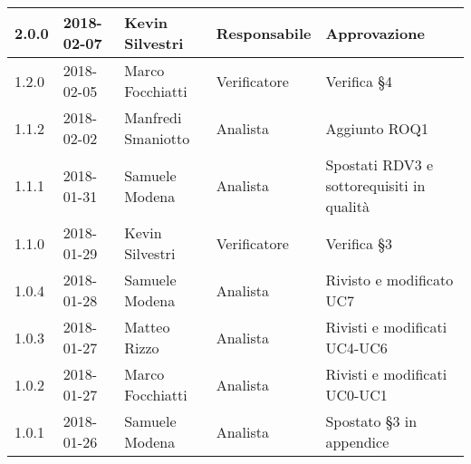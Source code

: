 \documentclass[./AnalisideiRequisiti.tex]{subfiles}
\begin{document}
{\begin{longtable}{|p{20mm}|p{20mm}|p{40mm}|p{30mm}|p{50mm}|}
		2.0.0 & 2018-02-07 & Kevin Silvestri & Responsabile & Approvazione\\ \hline 
		1.2.0 & 2018-02-05 & Marco Focchiatti & Verificatore & Verifica §4\\ \hline    
		1.1.2 & 2018-02-02 & Manfredi Smaniotto & Analista & Aggiunto ROQ1\\ \hline 
		1.1.1 & 2018-01-31 & Samuele Modena & Analista & Spostati RDV3 e sottorequisiti in qualità\\ \hline  
		1.1.0 & 2018-01-29 & Kevin Silvestri & Verificatore & Verifica §3\\ \hline  
		1.0.4 & 2018-01-28 & Samuele Modena & Analista & Rivisto e modificato UC7\\ \hline  
		1.0.3 & 2018-01-27 & Matteo Rizzo & Analista & Rivisti e modificati UC4-UC6\\ \hline    
		1.0.2 & 2018-01-27 & Marco Focchiatti & Analista & Rivisti e modificati UC0-UC1\\ \hline  
		1.0.1 & 2018-01-26 & Samuele Modena & Analista & Spostato §3 in appendice\\ \hline
		

\end{longtable}}
\end{document}
